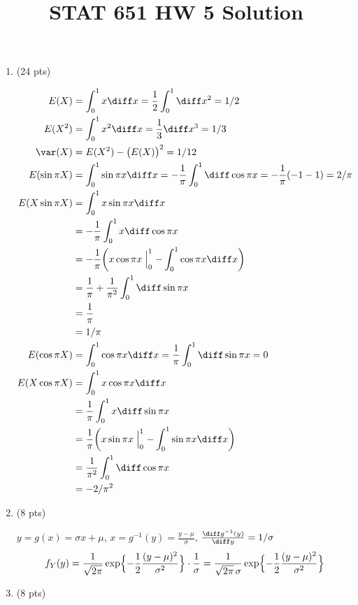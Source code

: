 \documentclass[12pt]{article}
\begin{document}
\title{STAT 651 HW 5 Solution}
\maketitle

\begin{enumerate}
\item (24 pts)

\begin{align*}
E(X) &= \int_0^1 x \diff x = \frac{1}{2}\int_0^1 \diff x^2 = 1/2
\\
E(X^2) &= \int_0^1 x^2 \diff x = \frac{1}{3} \diff x^3 = 1/3
\\
\var(X) &= E(X^2) - \bigl(E(X)\bigr)^2 = 1/12
\\
E(\sin \pi X)
&= \int_0^1 \sin\pi x \diff x
= - \frac{1}{\pi} \int_0^1 \diff \cos\pi x
= -\frac{1}{\pi} (-1 - 1)
= 2/\pi
\\
E(X\sin\pi X)
&= \int_0^1 x\sin\pi x \diff x
\\
&= -\frac{1}{\pi}\int_0^1 x \diff \cos\pi x
\\
&= -\frac{1}{\pi}\biggl(
    x\cos\pi x\Bigm|_0^1 - \int_0^1 \cos\pi x \diff x
        \biggr)
\\
&= \frac{1}{\pi} + \frac{1}{\pi^2} \int_0^1 \diff \sin \pi x
\\
&= \frac{1}{\pi}
\\
&= 1/\pi
\\
E(\cos\pi X)
&= \int_0^1 \cos\pi x\diff x
= \frac{1}{\pi}\int_0^1 \diff \sin\pi x
= 0
\\
E(X\cos\pi X)
&= \int_0^1 x\cos\pi x\diff x
\\
&= \frac{1}{\pi} \int_0^1 x \diff \sin\pi x
\\
&= \frac{1}{\pi} \biggl(
    x\sin\pi x\Bigm|_0^1 - \int_0^1 \sin\pi x\diff x\biggr)
\\
&= \frac{1}{\pi^2} \int_0^1 \diff \cos\pi x
\\
&= -2/\pi^2
\end{align*}

\item (8 pts)

$y = g(x) = \sigma x + \mu$,
$x = g^{-1}(y) = \frac{y - \mu}{\sigma}$,
$\frac{\diff g^{-1}(y)}{\diff y} = 1/\sigma$
\[
f_Y(y)
= \frac{1}{\sqrt{2\pi}}
    \exp\Bigl\{-\frac{1}{2}\frac{(y - \mu)^2}{\sigma^2}\Bigr\}
    \cdot
    \frac{1}{\sigma}
= \frac{1}{\sqrt{2\pi}\, \sigma}
    \exp\Bigl\{-\frac{1}{2}\frac{(y - \mu)^2}{\sigma^2}\Bigr\}
\]

\item (8 pts)


\end{enumerate}
\end{document}
